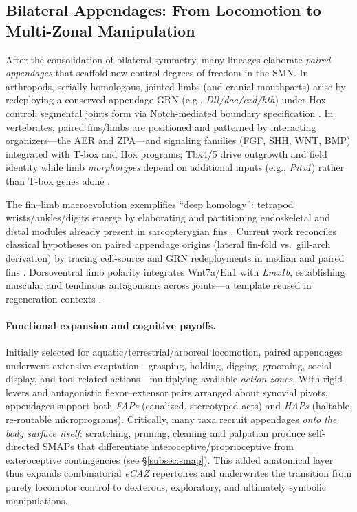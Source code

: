\subsection{Bilateral Appendages: From Locomotion to Multi-Zonal Manipulation}
\label{subsec:bilateral_appendages}

After the consolidation of bilateral symmetry, many lineages elaborate \emph{paired appendages} that scaffold new control degrees of freedom in the SMN. In arthropods, serially homologous, jointed limbs (and cranial mouthparts) arise by redeploying a conserved appendage GRN (e.g., \textit{Dll/dac/exd/hth}) under Hox control; segmental joints form via Notch-mediated boundary specification \citep{Panganiban1997OriginEvolutionAppendages,Prpic2009NotchSegmentation,Cordoba2020NotchLegReview,Chen2023NotchInsectReview}. In vertebrates, paired fins/limbs are positioned and patterned by interacting organizers—the AER and ZPA—and signaling families (FGF, SHH, WNT, BMP) integrated with T-box and Hox programs; Tbx4/5 drive outgrowth and field identity while limb \emph{morphotypes} depend on additional inputs (e.g., \textit{Pitx1}) rather than T-box genes alone \citep{Capdevila2001LimbPatterning,RodriguezEsteban1999Tbx4Tbx5,Minguillon2005Tbx5Tbx4NotSufficient,Duboc2021Tbx4FunctionHindlimb}.

The fin–limb macroevolution exemplifies ``deep homology'': tetrapod wrists/ankles/digits emerge by elaborating and partitioning endoskeletal and distal modules already present in sarcopterygian fins \citep{Shubin1997FossilsGenesLimbs,Shubin2006TiktaalikPectoralFin,Onimaru2020FinRayPNAS,Shubin2009DeepHomology}. Current work reconciles classical hypotheses on paired appendage origins (lateral fin-fold vs.\ gill-arch derivation) by tracing cell-source and GRN redeployments in median and paired fins \citep{Tzung2023MedianFinLPM,Diogo2020DualOriginPectoral}. Dorsoventral limb polarity integrates Wnt7a/En1 with \textit{Lmx1b}, establishing muscular and tendinous antagonisms across joints—a template reused in regeneration contexts \citep{Riddle2002Lmx1bDV,Gerber2022DVRegeneration}.

\paragraph{Functional expansion and cognitive payoffs.}
Initially selected for aquatic/terrestrial/arboreal locomotion, paired appendages underwent extensive exaptation—grasping, holding, digging, grooming, social display, and tool-related actions—multiplying available \emph{action zones}. With rigid levers and antagonistic flexor–extensor pairs arranged about synovial pivots, appendages support both \emph{FAPs} (canalized, stereotyped acts) and \emph{HAPs} (haltable, re-routable microprograms). Critically, many taxa recruit appendages \emph{onto the body surface itself}: scratching, pruning, cleaning and palpation produce self-directed SMAPs that differentiate interoceptive/proprioceptive from exteroceptive contingencies (see \S\ref{subsec:smap}). This added anatomical layer thus expands combinatorial \emph{eCAZ} repertoires and underwrites the transition from purely locomotor control to dexterous, exploratory, and ultimately symbolic manipulations.
